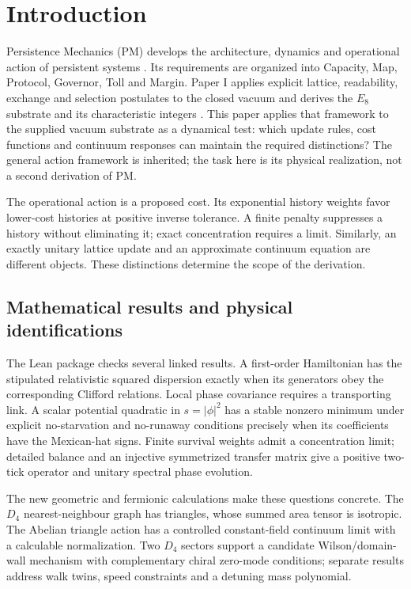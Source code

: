 \section{Introduction}

Persistence Mechanics (PM) develops the architecture, dynamics and operational action of persistent systems \cite{kate_meyer_persistence_2026}. Its requirements are organized into Capacity, Map, Protocol, Governor, Toll and Margin. Paper I applies explicit lattice, readability, exchange and selection postulates to the closed vacuum and derives the $E_8$ substrate and its characteristic integers \cite{meyer_informational_2026}. This paper applies that framework to the supplied vacuum substrate as a dynamical test: which update rules, cost functions and continuum responses can maintain the required distinctions? The general action framework is inherited; the task here is its physical realization, not a second derivation of PM.

The operational action is a proposed cost. Its exponential history weights favor lower-cost histories at positive inverse tolerance. A finite penalty suppresses a history without eliminating it; exact concentration requires a limit. Similarly, an exactly unitary lattice update and an approximate continuum equation are different objects. These distinctions determine the scope of the derivation.

\subsection{Mathematical results and physical identifications}
The Lean package checks several linked results. A first-order Hamiltonian has the stipulated relativistic squared dispersion exactly when its generators obey the corresponding Clifford relations. Local phase covariance requires a transporting link. A scalar potential quadratic in $s=|\phi|^2$ has a stable nonzero minimum under explicit no-starvation and no-runaway conditions precisely when its coefficients have the Mexican-hat signs. Finite survival weights admit a concentration limit; detailed balance and an injective symmetrized transfer matrix give a positive two-tick operator and unitary spectral phase evolution.

The new geometric and fermionic calculations make these questions concrete. The $D_4$ nearest-neighbour graph has triangles, whose summed area tensor is isotropic. The Abelian triangle action has a controlled constant-field continuum limit with a calculable normalization. Two $D_4$ sectors support a candidate Wilson/domain-wall mechanism with complementary chiral zero-mode conditions; separate results address walk twins, speed constraints and a detuning mass polynomial.

